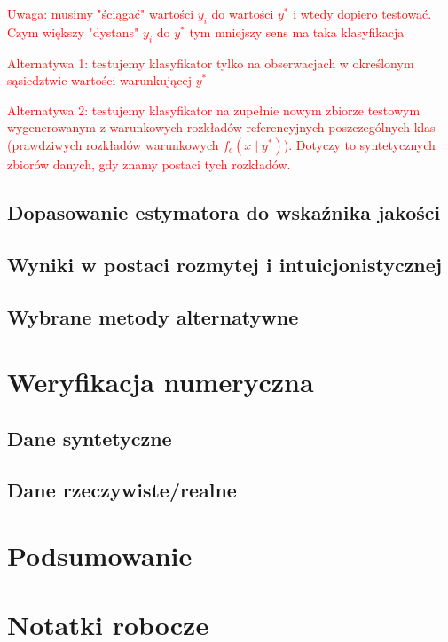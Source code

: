 \documentclass[12pt,a4paper,oneside]{book}
\theoremstyle{definition}
\begin{document}
\textcolor{red}{Uwaga: musimy "ściągać" wartości $y_i$ do wartości $y^*$ i wtedy dopiero testować. Czym większy "dystans" $y_i$ do $y^*$ tym mniejszy sens ma taka klasyfikacja}

\textcolor{red}{Alternatywa 1: testujemy klasyfikator tylko na obserwacjach w określonym sąsiedztwie wartości warunkującej $y^*$}

\textcolor{red}{Alternatywa 2: testujemy klasyfikator na zupełnie nowym zbiorze testowym wygenerowanym z warunkowych rozkładów referencyjnych poszczególnych klas (prawdziwych rozkładów warunkowych $f_c(x \mid y^*)$). Dotyczy to syntetycznych zbiorów danych, gdy znamy postaci tych rozkładów.}

\section{Dopasowanie estymatora do wskaźnika jakości}

\section{Wyniki w postaci rozmytej i intuicjonistycznej}

\section{Wybrane metody alternatywne}

\chapter{Weryfikacja numeryczna}

\section{Dane syntetyczne}

\section{Dane rzeczywiste/realne}

\chapter{Podsumowanie}

\chapter{Notatki robocze}
\end{document}
